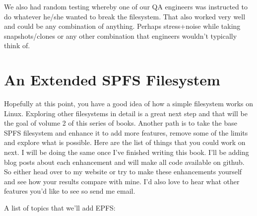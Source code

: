 We also had random testing whereby one of our QA engineers was instructed to do whatever he/she wanted to break the filesystem. That also worked very well and could be any combination of anything. Perhaps stress+noise while taking snapshots/clones or any other combination that engineers wouldn't typically think of.


\section{An Extended SPFS Filesystem}

Hopefully at this point, you have a good idea of how a simple filesystem works on Linux. Exploring other filesystems in detail is a great next step and that will be the goal of volume 2 of this series of books. Another path is to take the base SPFS filesystem and enhance it to add more features, remove some of the limits and explore what is possible. Here are the list of things that you could work on next. I will be doing the same once I've finished writing this book. I'll be adding blog posts about each enhancement and will make all code available on github. So either head over to my website or try to make these enhancements yourself and see how your results compare with mine. I'd also love to hear what other features you'd like to see so send me email.

A list of topics that we’ll add EPFS:

